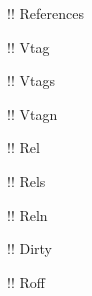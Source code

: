 \documentclass[10pt,a4paper]{article}
\begin{document}
!\gitReferences ! References

!\gitVtag ! Vtag

!\gitVtags ! Vtags

!\gitVtagn ! Vtagn

!\gitRel ! Rel

!\gitRels ! Rels

!\gitReln ! Reln

!\gitDirty ! Dirty

!\gitRoff ! Roff
\end{document}

